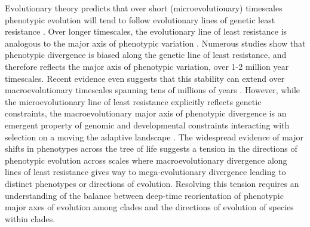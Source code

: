 \documentclass[12pt,letterpaper]{article}
\begin{document}
Evolutionary theory predicts that over short (microevolutionary) timescales phenotypic evolution will tend to follow evolutionary lines of genetic least resistance \cite{schluter1996adaptive}. Over longer timescales, the evolutionary line of least resistance is analogous to the major axis of phenotypic variation \cite{marroig2005size,fasanelli2022allometry}. Numerous studies show that phenotypic divergence is biased along the genetic line of least resistance, and therefore reflects the major axis of phenotypic variation, over 1-2 million year timescales. Recent evidence even suggests that this stability can extend over macroevolutionary timescales spanning tens of millions of years \cite{mcglothlin2018adaptive}. However, while the microevolutionary line of least resistance explicitly reflects genetic constraints, the macroevolutionary major axis of phenotypic divergence is an emergent property of genomic and developmental constraints interacting with selection on a moving the adaptive landscape \cite{jones2004evolution}. The widespread evidence of major shifts in phenotypes across the tree of life \cite{pagel2022general,cooney2017mega,venditti2011multiple,khabbazian2016fast,smaers2021evolution} suggests a tension in the directions of phenotypic evolution across scales where macroevolutionary divergence along lines of least resistance gives way to mega-evolutionary divergence leading to distinct phenotypes or directions of evolution. Resolving this tension requires an understanding of the balance between deep-time reorientation of phenotypic major axes of evolution among clades and the directions of evolution of species within clades.
\end{document}
